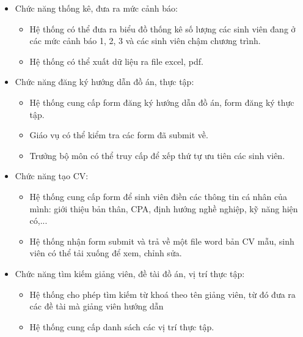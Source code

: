 \documentclass[12pt, a4paper]{report}
\begin{document}
\begin{itemize}
\begin{itemize}
        \end{itemize}
        \item Chức năng thống kê, đưa ra mức cảnh báo:
        \begin{itemize}
            \item Hệ thống có thể đưa ra biểu đồ thống kê số lượng các sinh viên đang ở các mức cảnh báo 1, 2, 3 và các sinh viên chậm chương trình.
            \item Hệ thống có thể xuất dữ liệu ra file excel, pdf.
        \end{itemize}
        \item Chức năng đăng ký hướng dẫn đồ án, thực tập:
        \begin{itemize}
            \item Hệ thống cung cấp form đăng ký hướng dẫn đồ án, form đăng ký thực tập.
            \item Giáo vụ có thể kiểm tra các form đã submit về.
            \item Trưởng bộ môn có thể truy cấp để xếp thứ tự ưu tiên các sinh viên.
        \end{itemize}
        \item Chức năng tạo CV:
        \begin{itemize}
            \item Hệ thống cung cấp form để sinh viên điền các thông tin cá nhân của mình: giới thiệu bản thân, CPA, định hướng nghề nghiệp, kỹ năng hiện có,...
            \item Hệ thống nhận form submit và trả về một file word bản CV mẫu, sinh viên có thể tải xuống để xem, chỉnh sửa.
        \end{itemize}
        \item Chức năng tìm kiếm giảng viên, đề tài đồ án, vị trí thực tập:
        \begin{itemize}
            \item Hệ thống cho phép tìm kiếm từ khoá theo tên giảng viên, từ đó đưa ra các đề tài mà giảng viên hướng dẫn
            \item Hệ thống cung cấp danh sách các vị trí thực tập.
        \end{itemize}
    \end{itemize}
    
\end{document}
